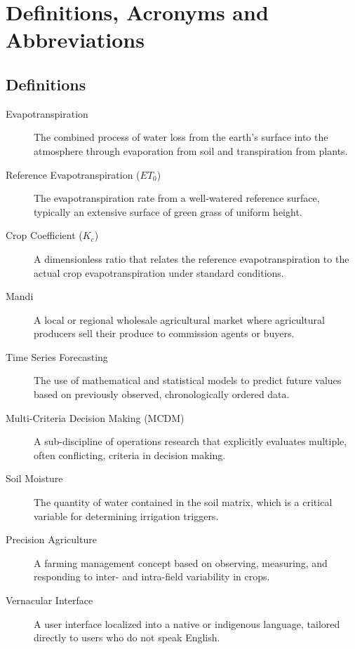 \section{Definitions, Acronyms and Abbreviations}

\subsection{Definitions}
\begin{description}
    \item[Evapotranspiration] The combined process of water loss from the earth's surface into the atmosphere through evaporation from soil and transpiration from plants.
    \item[Reference Evapotranspiration ($ET_0$)] The evapotranspiration rate from a well-watered reference surface, typically an extensive surface of green grass of uniform height.
    \item[Crop Coefficient ($K_c$)] A dimensionless ratio that relates the reference evapotranspiration to the actual crop evapotranspiration under standard conditions.
    \item[Mandi] A local or regional wholesale agricultural market where agricultural producers sell their produce to commission agents or buyers.
    \item[Time Series Forecasting] The use of mathematical and statistical models to predict future values based on previously observed, chronologically ordered data.
    \item[Multi-Criteria Decision Making (MCDM)] A sub-discipline of operations research that explicitly evaluates multiple, often conflicting, criteria in decision making.
    \item[Soil Moisture] The quantity of water contained in the soil matrix, which is a critical variable for determining irrigation triggers.
    \item[Precision Agriculture] A farming management concept based on observing, measuring, and responding to inter- and intra-field variability in crops.
    \item[Vernacular Interface] A user interface localized into a native or indigenous language, tailored directly to users who do not speak English.
\end{description}

